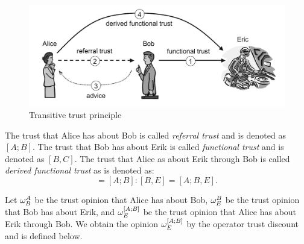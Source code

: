 \documentclass[a4paper,12pt]{article}
\theoremstyle{definition}
\numberwithin{equation}{section}
\begin{document}
\begin{figure}[htb]
	\centering
	\includegraphics[scale=0.4]{images/transitive-trust-principle.png}
	\caption{Transitive trust principle}
\end{figure}

The trust that Alice has about Bob is called \emph{referral trust} and is denoted as $[A; B]$. The trust that Bob has about Erik is called \emph{functional trust} and is denoted as $[B, C]$. The trust that Alice as about Erik through Bob is called \emph{derived functional trust} as is denoted as:
\begin{equation}
	[A, E] = [A; B] : [B, E] = [A; B, E] \text{.}
\end{equation}

Let $\omega^{A}_{B}$ be the trust opinion that Alice has about Bob, $\omega^{B}_{E}$ be the trust opinion that Bob has about Erik, and $\omega^{[A;B]}_{E}$ be the trust opinion that Alice has about Erik through Bob. We obtain the opinion $\omega^{[A;B]}_{E}$ by the operator trust discount and is defined below.
\end{document}
